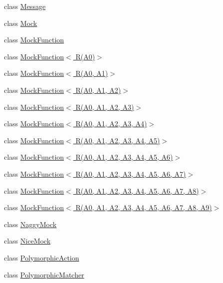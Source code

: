 \begin{DoxyCompactItemize}
class \hyperlink{classtesting_1_1Message}{Message}
\item 
class \hyperlink{classtesting_1_1Mock}{Mock}
\item 
class \hyperlink{classtesting_1_1MockFunction}{Mock\+Function}
\item 
class \hyperlink{classtesting_1_1MockFunction_3_01R_07A0_08_4}{Mock\+Function$<$ R(\+A0)$>$}
\item 
class \hyperlink{classtesting_1_1MockFunction_3_01R_07A0_00_01A1_08_4}{Mock\+Function$<$ R(\+A0, A1)$>$}
\item 
class \hyperlink{classtesting_1_1MockFunction_3_01R_07A0_00_01A1_00_01A2_08_4}{Mock\+Function$<$ R(\+A0, A1, A2)$>$}
\item 
class \hyperlink{classtesting_1_1MockFunction_3_01R_07A0_00_01A1_00_01A2_00_01A3_08_4}{Mock\+Function$<$ R(\+A0, A1, A2, A3)$>$}
\item 
class \hyperlink{classtesting_1_1MockFunction_3_01R_07A0_00_01A1_00_01A2_00_01A3_00_01A4_08_4}{Mock\+Function$<$ R(\+A0, A1, A2, A3, A4)$>$}
\item 
class \hyperlink{classtesting_1_1MockFunction_3_01R_07A0_00_01A1_00_01A2_00_01A3_00_01A4_00_01A5_08_4}{Mock\+Function$<$ R(\+A0, A1, A2, A3, A4, A5)$>$}
\item 
class \hyperlink{classtesting_1_1MockFunction_3_01R_07A0_00_01A1_00_01A2_00_01A3_00_01A4_00_01A5_00_01A6_08_4}{Mock\+Function$<$ R(\+A0, A1, A2, A3, A4, A5, A6)$>$}
\item 
class \hyperlink{classtesting_1_1MockFunction_3_01R_07A0_00_01A1_00_01A2_00_01A3_00_01A4_00_01A5_00_01A6_00_01A7_08_4}{Mock\+Function$<$ R(\+A0, A1, A2, A3, A4, A5, A6, A7)$>$}
\item 
class \hyperlink{classtesting_1_1MockFunction_3_01R_07A0_00_01A1_00_01A2_00_01A3_00_01A4_00_01A5_00_01A6_00_01A7_00_01A8_08_4}{Mock\+Function$<$ R(\+A0, A1, A2, A3, A4, A5, A6, A7, A8)$>$}
\item 
class \hyperlink{classtesting_1_1MockFunction_3_01R_07A0_00_01A1_00_01A2_00_01A3_00_01A4_00_01A5_00_01A6_00_01A7_00_01A8_00_01A9_08_4}{Mock\+Function$<$ R(\+A0, A1, A2, A3, A4, A5, A6, A7, A8, A9)$>$}
\item 
class \hyperlink{classtesting_1_1NaggyMock}{Naggy\+Mock}
\item 
class \hyperlink{classtesting_1_1NiceMock}{Nice\+Mock}
\item 
class \hyperlink{classtesting_1_1PolymorphicAction}{Polymorphic\+Action}
\item 
class \hyperlink{classtesting_1_1PolymorphicMatcher}{Polymorphic\+Matcher}

\end{DoxyCompactItemize}
